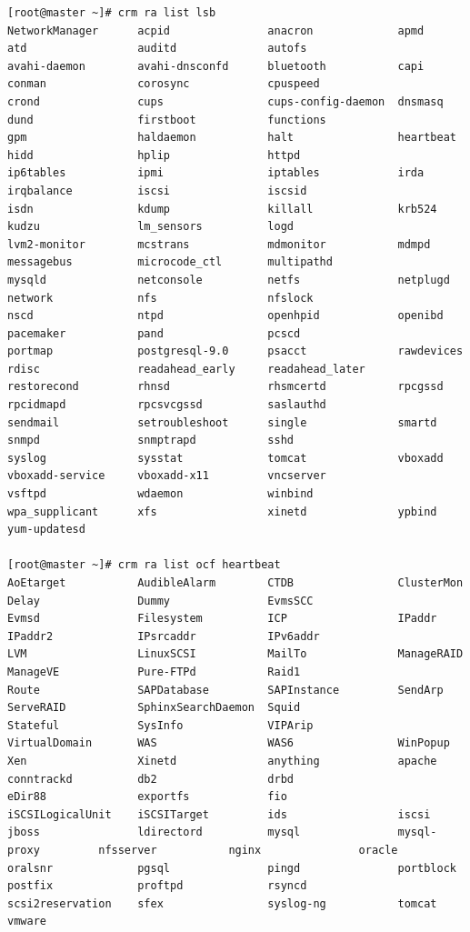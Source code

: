\begin{verbatim}
[root@master ~]# crm ra list lsb
NetworkManager      acpid               anacron             apmd                atd                 auditd              autofs
avahi-daemon        avahi-dnsconfd      bluetooth           capi                conman              corosync            cpuspeed
crond               cups                cups-config-daemon  dnsmasq             dund                firstboot           functions
gpm                 haldaemon           halt                heartbeat           hidd                hplip               httpd
ip6tables           ipmi                iptables            irda                irqbalance          iscsi               iscsid
isdn                kdump               killall             krb524              kudzu               lm_sensors          logd
lvm2-monitor        mcstrans            mdmonitor           mdmpd               messagebus          microcode_ctl       multipathd
mysqld              netconsole          netfs               netplugd            network             nfs                 nfslock
nscd                ntpd                openhpid            openibd             pacemaker           pand                pcscd
portmap             postgresql-9.0      psacct              rawdevices          rdisc               readahead_early     readahead_later
restorecond         rhnsd               rhsmcertd           rpcgssd             rpcidmapd           rpcsvcgssd          saslauthd
sendmail            setroubleshoot      single              smartd              snmpd               snmptrapd           sshd
syslog              sysstat             tomcat              vboxadd             vboxadd-service     vboxadd-x11         vncserver
vsftpd              wdaemon             winbind             wpa_supplicant      xfs                 xinetd              ypbind
yum-updatesd

[root@master ~]# crm ra list ocf heartbeat
AoEtarget           AudibleAlarm        CTDB                ClusterMon          Delay               Dummy               EvmsSCC
Evmsd               Filesystem          ICP                 IPaddr              IPaddr2             IPsrcaddr           IPv6addr
LVM                 LinuxSCSI           MailTo              ManageRAID          ManageVE            Pure-FTPd           Raid1
Route               SAPDatabase         SAPInstance         SendArp             ServeRAID           SphinxSearchDaemon  Squid
Stateful            SysInfo             VIPArip             VirtualDomain       WAS                 WAS6                WinPopup
Xen                 Xinetd              anything            apache              conntrackd          db2                 drbd
eDir88              exportfs            fio                 iSCSILogicalUnit    iSCSITarget         ids                 iscsi
jboss               ldirectord          mysql               mysql-proxy         nfsserver           nginx               oracle
oralsnr             pgsql               pingd               portblock           postfix             proftpd             rsyncd
scsi2reservation    sfex                syslog-ng           tomcat              vmware 


\end{verbatim}
